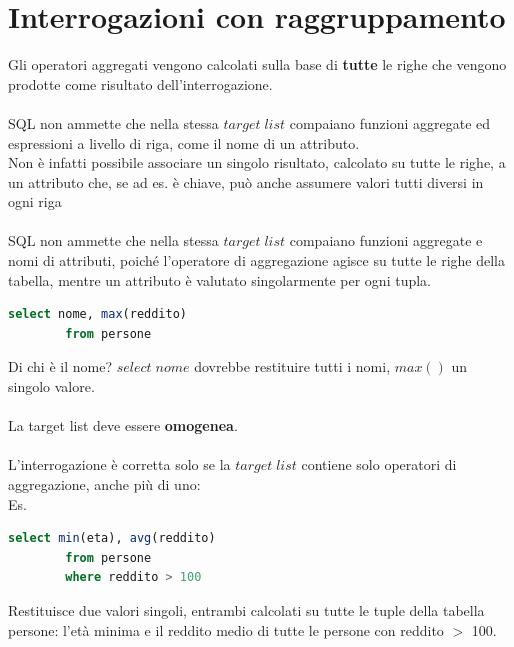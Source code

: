 \documentclass{article}
\begin{document}
	\section{Interrogazioni con raggruppamento}
	Gli operatori aggregati vengono calcolati sulla base di \textbf{tutte} le righe che vengono prodotte come risultato dell’interrogazione.\\\\
	SQL non ammette che nella stessa $target \; list$ compaiano funzioni aggregate ed espressioni a livello di riga, come il nome di un attributo. \\
	Non è infatti possibile associare un singolo risultato, calcolato su tutte le righe, a un attributo che, se ad es. è chiave, può anche assumere valori tutti diversi in ogni riga\\\\
	SQL non ammette che nella stessa $target \; list$ compaiano funzioni aggregate e nomi di attributi, poiché l’operatore di aggregazione agisce su tutte le righe della tabella, mentre un attributo è valutato singolarmente per ogni tupla.
	\begin{lstlisting}[language=SQL]
		select nome, max(reddito)
		from persone
	\end{lstlisting}
	Di chi è il nome? $select \; nome$ dovrebbe restituire tutti i nomi, $max()$ un singolo valore.\\\\
	La target list deve essere \textbf{omogenea}.\\\\
	L’interrogazione è corretta solo se la $target \; list$ contiene solo operatori di aggregazione, anche più di uno:\\
	Es.
	\begin{lstlisting}[language=SQL]
		select min(eta), avg(reddito)
		from persone
		where reddito > 100
	\end{lstlisting}
	Restituisce due valori singoli, entrambi calcolati su tutte le tuple della tabella persone: l’età minima e il reddito medio di tutte le persone con reddito $>$ 100.
\end{document}
